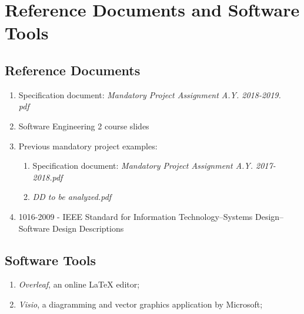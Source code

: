 \section{Reference Documents and Software Tools}

    \subsection{Reference Documents}
        \begin{enumerate}
            \item Specification document: \textit{Mandatory Project Assignment A.Y. 2018-2019.\\pdf}
            
            \item Software Engineering 2 course slides
            
            \item Previous mandatory project examples: 
                \begin{enumerate}
                    \item Specification document: \textit{Mandatory Project Assignment A.Y. 2017-2018.pdf}
                    
                    \item \textit{DD to be analyzed.pdf}
                \end{enumerate}
                
            \item 1016-2009 - IEEE Standard for Information Technology--Systems Design--Software Design Descriptions
        \end{enumerate}
        
    \subsection{Software Tools}
    
        \begin{enumerate}
            \item \emph{Overleaf}, an online LaTeX editor;
            \item \emph{Visio}, a diagramming and vector graphics application by Microsoft;
        \end{enumerate}